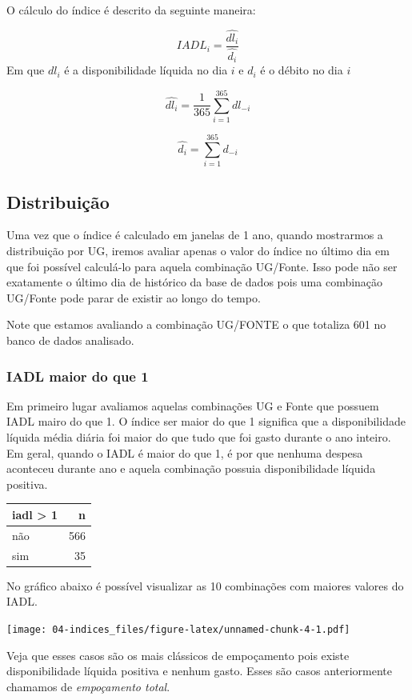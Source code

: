 \documentclass[
]{book}
\begin{document}
O cálculo do índice é descrito da seguinte maneira:

\[IADL_i = \frac{\hat{dl_i}}{\hat{d_i}}\]
Em que \(dl_i\) é a disponibilidade líquida no dia \(i\) e \(d_i\) é o débito no dia \(i\)

\[\hat{dl_i} = \frac{1}{365}\sum_{i=1}^{365}dl_{-i}\]

\[\hat{d_i} = \sum_{i=1}^{365} d_{-i}\]

\hypertarget{distribuiuxe7uxe3o}{%
\subsection{Distribuição}\label{distribuiuxe7uxe3o}}

Uma vez que o índice é calculado em janelas de 1 ano, quando mostrarmos a distribuição por UG, iremos avaliar apenas o valor do índice no último dia em que foi possível calculá-lo para aquela combinação UG/Fonte. Isso pode não ser exatamente o último dia de histórico da base de dados pois uma combinação UG/Fonte pode parar de existir ao longo do tempo.

Note que estamos avaliando a combinação UG/FONTE o que totaliza 601 no banco de dados analisado.

\hypertarget{iadl-maior-do-que-1}{%
\subsubsection{IADL maior do que 1}\label{iadl-maior-do-que-1}}

Em primeiro lugar avaliamos aquelas combinações UG e Fonte que possuem IADL mairo do que 1. O índice ser maior do que 1 significa que a disponibilidade líquida média diária foi maior do que tudo que foi gasto durante o ano inteiro. Em geral, quando o IADL é maior do que 1, é por que nenhuma despesa aconteceu durante ano e aquela combinação possuia disponibilidade líquida positiva.

\begin{tabular}{l|r}
\hline
iadl > 1 & n\\
\hline
não & 566\\
\hline
sim & 35\\
\hline
\end{tabular}

No gráfico abaixo é possível visualizar as 10 combinações com maiores valores do IADL.

\texttt{[image: 04-indices\_files/figure-latex/unnamed-chunk-4-1.pdf]}

Veja que esses casos são os mais clássicos de empoçamento pois existe disponibilidade líquida positiva e nenhum gasto. Esses são casos anteriormente chamamos de \emph{empoçamento total}.
\end{document}
